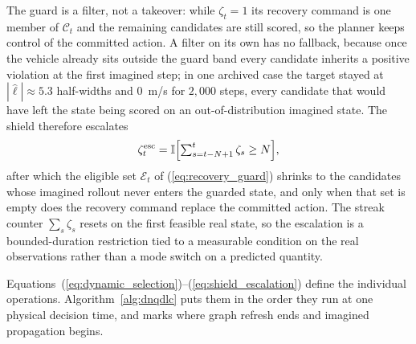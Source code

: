 \documentclass[journal]{IEEEtran}
\begin{document}
The guard is a filter, not a takeover: while $\zeta_t=1$ its recovery command is
one member of $\mathcal C_t$ and the remaining candidates are still scored, so
the planner keeps control of the committed action. A filter on its own has no
fallback, because once the vehicle already sits outside the guard band every
candidate inherits a positive violation at the first imagined step; in one
archived case the target stayed at $|\hat\ell|\approx5.3$ half-widths and
$0$~m/s for $2{,}000$ steps, every candidate that would have left the state
being scored on an out-of-distribution imagined state. The shield therefore
escalates
\begin{equation}
\zeta_t^{\rm esc}=\mathbb I\Bigl[\textstyle\sum_{s=t-N+1}^{t}\zeta_s\ge N\Bigr],
\label{eq:shield_escalation}
\end{equation}
after which the eligible set $\mathcal E_t$ of (\ref{eq:recovery_guard}) shrinks
to the candidates whose imagined rollout never enters the guarded state, and
only when that set is empty does the recovery command replace the committed
action. The streak counter $\sum_s\zeta_s$ resets on the first feasible real
state, so the escalation is a bounded-duration restriction tied to a measurable
condition on the real observations rather than a mode switch on a predicted
quantity.

Equations~(\ref{eq:dynamic_selection})--(\ref{eq:shield_escalation}) define the
individual operations. Algorithm~\ref{alg:dnqdlc} puts them in the order they
run at one physical decision time, and marks where graph refresh ends and
imagined propagation begins.
\end{document}
